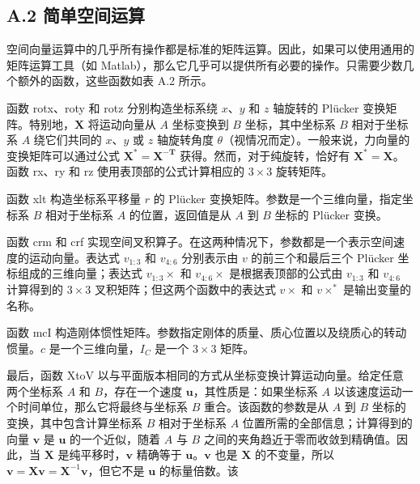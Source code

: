 \documentclass[10pt,a4paper]{book}
\theoremstyle{thmstyle} %
\theoremstyle{defstyle} %
\theoremstyle{prostyle} %
\begin{document}
\subsection{A.2 简单空间运算}





空间向量运算中的几乎所有操作都是标准的矩阵运算。因此，如果可以使用通用的矩阵运算工具（如 Matlab），那么它几乎可以提供所有必要的操作。只需要少数几个额外的函数，这些函数如表 A.2 所示。



函数 rotx、roty 和 rotz 分别构造坐标系绕 $x$、$y$ 和 $z$ 轴旋转的 Plücker 变换矩阵。特别地，$\mathbf{X}$ 将运动向量从 $A$ 坐标变换到 $B$ 坐标，其中坐标系 $B$ 相对于坐标系 $A$ 绕它们共同的 $x$、$y$ 或 $z$ 轴旋转角度 $\theta$（视情况而定）。一般来说，力向量的变换矩阵可以通过公式 $\mathbf{X}^* = \mathbf{X}^{-\mathbf{T}}$ 获得。然而，对于纯旋转，恰好有 $\mathbf{X}^* = \mathbf{X}$。函数 rx、ry 和 rz 使用表顶部的公式计算相应的 $3 \times 3$ 旋转矩阵。



函数 xlt 构造坐标系平移量 $r$ 的 Plücker 变换矩阵。参数是一个三维向量，指定坐标系 $B$ 相对于坐标系 $A$ 的位置，返回值是从 $A$ 到 $B$ 坐标的 Plücker 变换。



函数 crm 和 crf 实现空间叉积算子。在这两种情况下，参数都是一个表示空间速度的运动向量。表达式 $v_{1:3}$ 和 $v_{4:6}$ 分别表示由 $v$ 的前三个和最后三个 Plücker 坐标组成的三维向量；表达式 $v_{1:3} \times$ 和 $v_{4:6} \times$ 是根据表顶部的公式由 $v_{1:3}$ 和 $v_{4:6}$ 计算得到的 $3 \times 3$ 叉积矩阵；但这两个函数中的表达式 $v \times$ 和 $v \times^*$ 是输出变量的名称。



函数 mcI 构造刚体惯性矩阵。参数指定刚体的质量、质心位置以及绕质心的转动惯量。$c$ 是一个三维向量，$I_C$ 是一个 $3 \times 3$ 矩阵。



最后，函数 XtoV 以与平面版本相同的方式从坐标变换计算运动向量。给定任意两个坐标系 $A$ 和 $B$，存在一个速度 $\boldsymbol{u}$，其性质是：如果坐标系 $A$ 以该速度运动一个时间单位，那么它将最终与坐标系 $B$ 重合。该函数的参数是从 $A$ 到 $B$ 坐标的变换，其中包含计算坐标系 $B$ 相对于坐标系 $A$ 位置所需的全部信息；计算得到的向量 $\boldsymbol{v}$ 是 $\boldsymbol{u}$ 的一个近似，随着 $A$ 与 $B$ 之间的夹角趋近于零而收敛到精确值。因此，当 $\boldsymbol{X}$ 是纯平移时，$\boldsymbol{v}$ 精确等于 $\boldsymbol{u}$。$\boldsymbol{v}$ 也是 $\boldsymbol{X}$ 的不变量，所以 $\boldsymbol{v}=\boldsymbol{X}\boldsymbol{v}=\boldsymbol{X}^{-1}\boldsymbol{v}$，但它不是 $\boldsymbol{u}$ 的标量倍数。该
\end{document}
